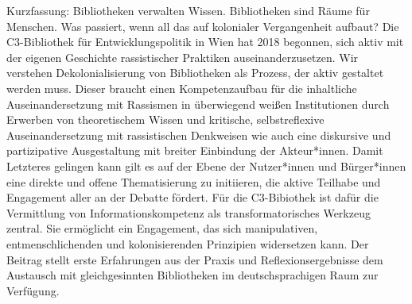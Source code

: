 Kurzfassung: Bibliotheken verwalten Wissen. Bibliotheken sind Räume für
Menschen. Was passiert, wenn all das auf kolonialer Vergangenheit
aufbaut? Die C3-Bibliothek für Entwicklungspolitik in Wien hat 2018
begonnen, sich aktiv mit der eigenen Geschichte rassistischer Praktiken
auseinanderzusetzen. Wir verstehen Dekolonialisierung von Bibliotheken
als Prozess, der aktiv gestaltet werden muss. Dieser braucht einen
Kompetenzaufbau für die inhaltliche Auseinandersetzung mit Rassismen in
überwiegend weißen Institutionen durch Erwerben von theoretischem Wissen
und kritische, selbstreflexive Auseinandersetzung mit rassistischen
Denkweisen wie auch eine diskursive und partizipative Ausgestaltung mit
breiter Einbindung der Akteur*innen. Damit Letzteres gelingen kann gilt
es auf der Ebene der Nutzer*innen und Bürger*innen eine direkte und
offene Thematisierung zu initiieren, die aktive Teilhabe und Engagement
aller an der Debatte fördert. Für die C3-Bibiothek ist dafür die
Vermittlung von Informationskompetenz als transformatorisches Werkzeug
zentral. Sie ermöglicht ein Engagement, das sich manipulativen,
entmenschlichenden und kolonisierenden Prinzipien widersetzen kann. Der
Beitrag stellt erste Erfahrungen aus der Praxis und Reflexionsergebnisse
dem Austausch mit gleichgesinnten Bibliotheken im deutschsprachigen Raum
zur Verfügung.
